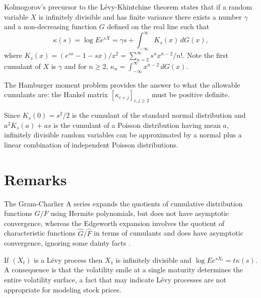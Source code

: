 \documentclass[fleqn]{amsart}
\newcommand{\Var}{\mathop{\rm{Var}}}
\theoremstyle{definition}
\begin{document}


Kolmogorov's precursor to the L\'evy-Khintchine theorem\cite{Kol1992}
states that if a random variable \(X\) is infinitely divisible
and has finite variance
there exists a number \(\gamma\) and a non-decreasing function
\(G\) defined on the real line such that
\[
\kappa(s) = \log Ee^{sX} = \gamma s + \int_{-\infty}^\infty K_s(x)\,dG(x),
\]
where \(K_s(x) = (e^{sx} - 1 - sx)/x^2 = \sum_{n=2}^\infty s^nx^{n-2}/n!\).
Note the first cumulant of \(X\) is \(\gamma\) and for \(n\ge 2\),
\(\kappa_n = \int_{-\infty}^\infty x^{n-2}\,dG(x)\).

The Hamburger moment problem\cite{ShoTam1943} provides the answer to
what the allowable cumulants are: the Hankel matrix
\([\kappa_{i+j}]_{i,j\ge 2}\) must be positive definite.

Since \(K_s(0) = s^2/2\) is the cumulant of the standard normal
distribution and \(a^2K_s(a) + as\) is the cumulant of a
Poisson distribution having mean \(a\),
infinitely divisible random variables can be
approximated by a normal plus a linear combination of
independent Poisson distributions.

%


\section{Remarks}
The Gram-Charlier A series expands the quotients of cumulative
distribution functions \(G/F\) using Hermite polynomials, but does not
have asymptotic convergence, whereas the Edgeworth expansion involves
the quotient of characteristic functions \(\hat G/\hat F\) in terms of
cumulants and does have asymptotic convergence, ignoring some dainty
facts \cite{Pet1975}.

If \((X_t)\) is a L\'evy process then \(X_1\) is
infinitely divisible and \(\log Ee^{sX_t} = t\kappa(s)\).
A consequence is that the volatility smile at a single
maturity determines the entire volatility surface, a fact that
may indicate L\'evy processes are not appropriate for
modeling stock prices.




\end{document}

